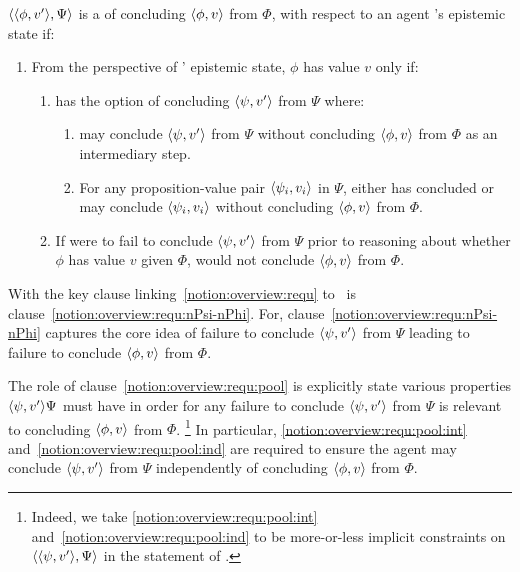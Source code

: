 \begin{note}
  \begin{notion}[\requ{3}]
    \label{notion:overview:requ}
    \(\langle \langle \phi, v' \rangle, \Psi \rangle\) is a \requ{} of concluding \(\langle \phi, v \rangle\) from \(\Phi\), with respect to an agent \vAgent{}'s epistemic state if:
    \begin{enumerate}
    \item
      \label{notion:overview:requ:main}
      From the perspective of \vAgent{}' epistemic state, \(\phi\) has value \(v\) only if:
      \begin{enumerate}[label=\alph*., ref=\named{R:\alph*}]
      \item
        \label{notion:overview:requ:pool}
        \vAgent{} has the option of concluding \(\langle \psi, v' \rangle\) from \(\Psi\) where:
        \begin{enumerate}[label=\roman*., ref=\named{R:a.\roman*}, series=csIdeaCounter]
        \item
          \label{notion:overview:requ:pool:int}
          \vAgent{} may conclude \(\langle \psi, v' \rangle\) from \(\Psi\) without concluding \(\langle \phi, v \rangle\) from \(\Phi\) as an intermediary step.
        \item
          \label{notion:overview:requ:pool:ind}
          For any proposition-value pair \(\langle \psi_{i}, v_{i} \rangle\) in \(\Psi\), \vAgent{} either has concluded or may conclude \(\langle \psi_{i}, v_{i} \rangle\) without concluding \(\langle \phi, v \rangle\) from \(\Phi\).
        \end{enumerate}
      \item
        \label{notion:overview:requ:nPsi-nPhi}
        If \vAgent{} were to fail to conclude \(\langle \psi, v' \rangle\) from \(\Psi\) prior to reasoning about whether \(\phi\) has value \(v\) given \(\Phi\), \vAgent{} would not conclude \(\langle \phi, v \rangle\) from \(\Phi\).
      \end{enumerate}
    \end{enumerate}
    \vspace{-\baselineskip}
  \end{notion}

  With the key clause linking~\autoref{notion:overview:requ} to~\qzS{} is clause~\ref{notion:overview:requ:nPsi-nPhi}.
  For, clause~\ref{notion:overview:requ:nPsi-nPhi} captures the core idea of failure to conclude \(\langle \psi, v' \rangle\) from \(\Psi\) leading to failure to conclude \(\langle \phi, v \rangle\) from \(\Phi\).

  The role of clause~\ref{notion:overview:requ:pool} is explicitly state various properties \(\langle \psi, v' \rangle{\Psi}\) must have in order for any failure to conclude \(\langle \psi, v' \rangle\) from \(\Psi\) is relevant to concluding \(\langle \phi, v \rangle\) from \(\Phi\).%
  \footnote{
    Indeed, we take \ref{notion:overview:requ:pool:int} and~\ref{notion:overview:requ:pool:ind} to be more-or-less implicit constraints on \(\langle \langle \psi, v' \rangle, \Psi \rangle\) in the statement of \qzS{}.
  }
  In particular, \ref{notion:overview:requ:pool:int} and~\ref{notion:overview:requ:pool:ind} are required to ensure the agent may conclude \(\langle \psi, v' \rangle\) from \(\Psi\) independently of concluding \(\langle \phi, v \rangle\) from \(\Phi\).


\end{note}

